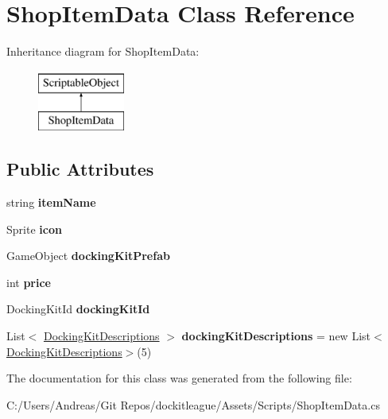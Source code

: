 \hypertarget{class_shop_item_data}{}\section{Shop\+Item\+Data Class Reference}
\label{class_shop_item_data}
Inheritance diagram for Shop\+Item\+Data\+:\begin{figure}[H]
\begin{center}
\leavevmode
\includegraphics[height=2.000000cm]{class_shop_item_data}
\end{center}
\end{figure}
\subsection*{Public Attributes}
\begin{DoxyCompactItemize}
\item 
\hypertarget{class_shop_item_data_a54b388d0406620dfad29ed63632d8c5e}{}\label{class_shop_item_data_a54b388d0406620dfad29ed63632d8c5e} 
string {\bfseries item\+Name}
\item 
\hypertarget{class_shop_item_data_a41f2bce9b9d324548da076e81322a01a}{}\label{class_shop_item_data_a41f2bce9b9d324548da076e81322a01a} 
Sprite {\bfseries icon}
\item 
\hypertarget{class_shop_item_data_a050b9c01232b177c3af1fe6a8d2f1f45}{}\label{class_shop_item_data_a050b9c01232b177c3af1fe6a8d2f1f45} 
Game\+Object {\bfseries docking\+Kit\+Prefab}
\item 
\hypertarget{class_shop_item_data_abea2b18b4fc1c26ba195ac26613f1389}{}\label{class_shop_item_data_abea2b18b4fc1c26ba195ac26613f1389} 
int {\bfseries price}
\item 
\hypertarget{class_shop_item_data_a117fe10aeec0ca1371c245c2d9f479b5}{}\label{class_shop_item_data_a117fe10aeec0ca1371c245c2d9f479b5} 
Docking\+Kit\+Id {\bfseries docking\+Kit\+Id}
\item 
\hypertarget{class_shop_item_data_aba4fc3b3afd269b4dc865e430e2ccbad}{}\label{class_shop_item_data_aba4fc3b3afd269b4dc865e430e2ccbad} 
List$<$ \hyperlink{struct_docking_kit_descriptions}{Docking\+Kit\+Descriptions} $>$ {\bfseries docking\+Kit\+Descriptions} = new List$<$\hyperlink{struct_docking_kit_descriptions}{Docking\+Kit\+Descriptions}$>$(5)
\end{DoxyCompactItemize}


The documentation for this class was generated from the following file\+:\begin{DoxyCompactItemize}
\item 
C\+:/\+Users/\+Andreas/\+Git Repos/dockitleague/\+Assets/\+Scripts/Shop\+Item\+Data.\+cs\end{DoxyCompactItemize}
